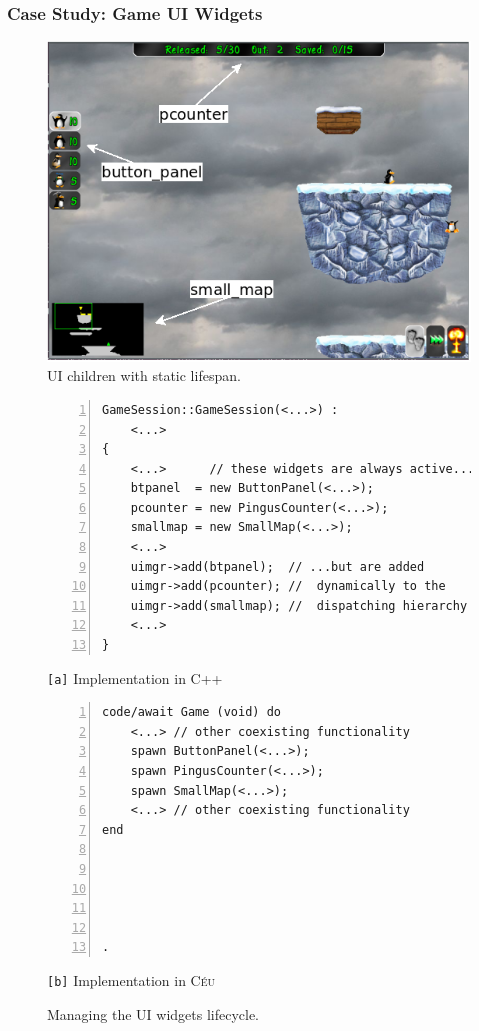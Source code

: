 \documentclass{vgtc}                          %
\newcommand{\CEU}{\textsc{C\'{e}u}\xspace}
\newcommand{\code}[1] {{\small{\texttt{#1}}}}
\newcommand{\ax}{\code{[a]}\xspace}
\newcommand{\bx}{\code{[b]}\xspace}
\begin{document}
\subsubsection{Case Study: Game UI Widgets}

\begin{figure}[t]
\centering
\includegraphics[width=\columnwidth]{game-session-arrows}
\caption{UI children with static lifespan.
\label{fig.ui}
}
\end{figure}

\begin{figure}[t]
\begin{minipage}[t]{0.54\linewidth}
\begin{lstlisting}[numbers=left,xleftmargin=3em]
GameSession::GameSession(<...>) :
    <...>
{
    <...>      // these widgets are always active...
    btpanel  = new ButtonPanel(<...>);
    pcounter = new PingusCounter(<...>);
    smallmap = new SmallMap(<...>);
    <...>
    uimgr->add(btpanel);  // ...but are added
    uimgr->add(pcounter); //  dynamically to the
    uimgr->add(smallmap); //  dispatching hierarchy
    <...>
}
\end{lstlisting}
\centering\small{\ax Implementation in C++}
\end{minipage}
%
\begin{minipage}[t]{0.46\linewidth}
\begin{lstlisting}[numbers=left,xleftmargin=3em]
code/await Game (void) do
    <...> // other coexisting functionality
    spawn ButtonPanel(<...>);
    spawn PingusCounter(<...>);
    spawn SmallMap(<...>);
    <...> // other coexisting functionality
end





.
\end{lstlisting}
\centering\small{\bx Implementation in \CEU}
\end{minipage}
\caption{ Managing the UI widgets lifecycle.
\label{lst.ui}
}
\end{figure}
\end{document}
